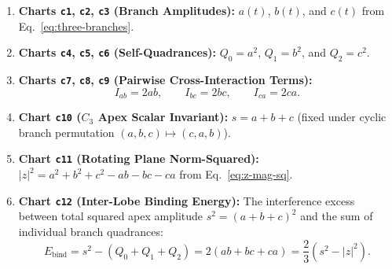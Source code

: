 \documentclass[11pt, a4paper]{article}
\begin{document}
\begin{enumerate}
    \item \textbf{Charts \texttt{c1}, \texttt{c2}, \texttt{c3} (Branch Amplitudes):} $a(t)$, $b(t)$, and $c(t)$ from Eq.~\eqref{eq:three-branches}.
    \item \textbf{Charts \texttt{c4}, \texttt{c5}, \texttt{c6} (Self-Quadrances):} $Q_0 = a^2$, $Q_1 = b^2$, and $Q_2 = c^2$.
    \item \textbf{Charts \texttt{c7}, \texttt{c8}, \texttt{c9} (Pairwise Cross-Interaction Terms):}
    \begin{equation}
    I_{ab} = 2ab, \qquad I_{bc} = 2bc, \qquad I_{ca} = 2ca.
    \end{equation}
    \item \textbf{Chart \texttt{c10} ($C_3$ Apex Scalar Invariant):} $s = a + b + c$ (fixed under cyclic branch permutation $(a,b,c) \mapsto (c,a,b)$).
    \item \textbf{Chart \texttt{c11} (Rotating Plane Norm-Squared):} $|z|^2 = a^2 + b^2 + c^2 - ab - bc - ca$ from Eq.~\eqref{eq:z-mag-sq}.
    \item \textbf{Chart \texttt{c12} (Inter-Lobe Binding Energy):} The interference excess between total squared apex amplitude $s^2 = (a+b+c)^2$ and the sum of individual branch quadrances:
    \begin{equation}
    E_{\text{bind}} = s^2 - (Q_0 + Q_1 + Q_2) = 2(ab + bc + ca) = \frac{2}{3}\left(s^2 - |z|^2\right).
    \end{equation}
\end{enumerate}
\end{document}
